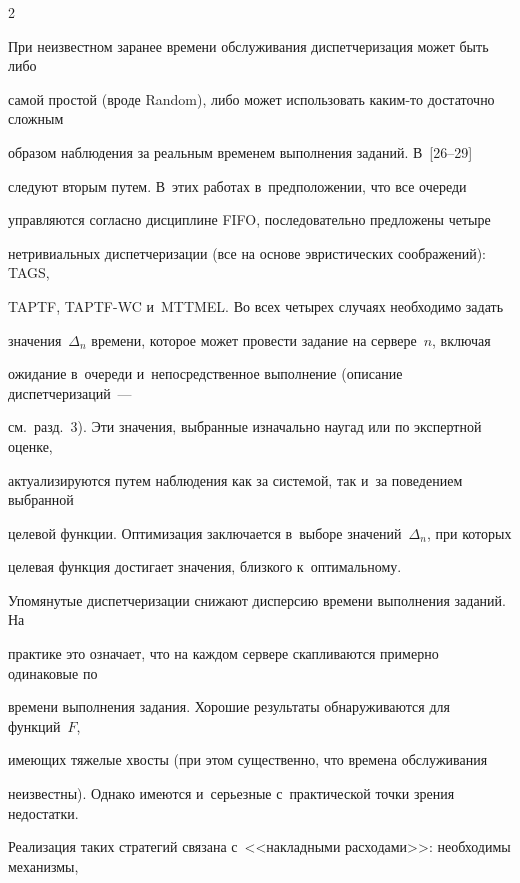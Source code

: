 \begin{multicols}{2}
   


   \vspace*{-1pt}


   


    При неизвестном заранее времени обслуживания диспетчеризация может быть либо 


самой простой (вроде Random), либо может использовать каким-то достаточно сложным 


образом наблюдения за реальным временем выполнения заданий. В~[26--29] 


следуют вторым путем. В~этих работах в~предположении, что все очереди 


управляются согласно дисциплине FIFO, последовательно предложены четыре 


нетривиальных диспетчеризации (все на основе эвристических соображений): TAGS, 


TAPTF, TAPTF-WC и~MTTMEL. Во всех четырех случаях необходимо задать 


значения~$\Delta_n$ времени, которое может провести задание на сервере~$n$, включая 


ожидание в~очереди и~непосредственное выполнение (описание диспетчеризаций~--- 


см.\ разд.~3). Эти значения, выбранные изначально наугад или по экспертной оценке, 


актуализируются путем наблюдения как за системой, так и~за поведением выбранной 


целевой функции. Оптимизация заключается в~выборе значений~$\Delta_n$, при которых 


целевая функция достигает значения, близкого к~оптимальному.


    


    Упомянутые диспетчеризации снижают дис\-пер\-сию времени выполнения заданий. На 


практике это означает, что на каждом сервере скапливаются примерно одинаковые по 


времени выполнения задания. Хорошие результаты обнаруживаются для функций~$F$, 


имеющих тяжелые хвосты (при этом существенно, что времена обслуживания 


неизвестны). Однако имеются и~серьезные с~практической точки зрения недостатки. 


Реализация таких стратегий связана с~<<накладными расходами>>: необходимы механизмы, 



\end{multicols}
